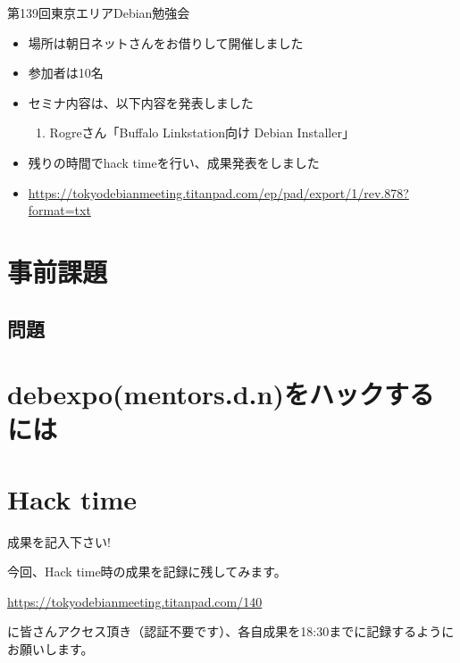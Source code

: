\begin{frame}{第139回東京エリアDebian勉強会 }

\begin{itemize}
\item 場所は朝日ネットさんをお借りして開催しました
\item 参加者は10名
\item セミナ内容は、以下内容を発表しました
  \begin{enumerate}
  \item Rogreさん「Buffalo Linkstation向け Debian Installer」
  \end{enumerate}
\item 残りの時間でhack timeを行い、成果発表をしました
\item \url{https://tokyodebianmeeting.titanpad.com/ep/pad/export/1/rev.878?format=txt}
\end{itemize} 
\end{frame}

\section{事前課題}
% 

\subsection{問題}



\section{debexpo(mentors.d.n)をハックするには}

\section{Hack time}

\begin{frame}{成果を記入下さい!}

  今回、Hack time時の成果を記録に残してみます。

\url{https://tokyodebianmeeting.titanpad.com/140}

に皆さんアクセス頂き（認証不要です）、各自成果を18:30までに記録するようにお願いします。

\end{frame}
  
